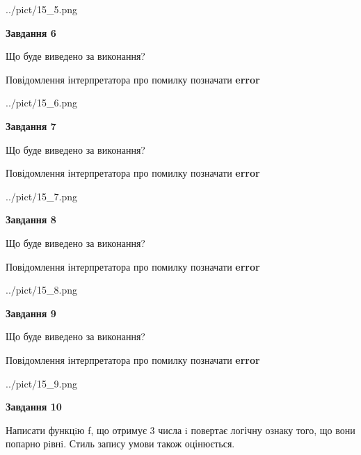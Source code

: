 \documentclass[12pt, ukrainian]{article}
\begin{document}
{\begin {large}
\begin{center}
	{../pict/15_5.png}
\end{center}
\newpage

{\begin {center}\textbf{Завдання 6}\end {center}}\par
Що буде виведено за виконання? \par
Повідомлення інтерпретатора про помилку позначати \textbf{error}

\begin{center}
	{../pict/15_6.png}
\end{center}
\newpage

{\begin {center}\textbf{Завдання 7}\end {center}}\par
Що буде виведено за виконання? \par
Повідомлення інтерпретатора про помилку позначати \textbf{error}

\begin{center}
	{../pict/15_7.png}
\end{center}
\newpage

{\begin {center}\textbf{Завдання 8}\end {center}}\par
Що буде виведено за виконання? \par
Повідомлення інтерпретатора про помилку позначати \textbf{error}

\begin{center}
	{../pict/15_8.png}
\end{center}
\newpage

{\begin {center}\textbf{Завдання 9}\end {center}}\par
Що буде виведено за виконання? \par
Повідомлення інтерпретатора про помилку позначати \textbf{error}

\begin{center}
	{../pict/15_9.png}
\end{center}
\newpage

{\begin {center}\textbf{Завдання 10}\end {center}}\par

Написати функцiю f, що отримує 3 числа i повертає логічну ознаку того, що вони попарно рiвнi. Стиль запису умови також оцінюється.\par
\newpage

\end {large}}
\end{document}
